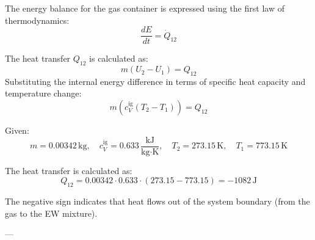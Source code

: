 The energy balance for the gas container is expressed using the first law of thermodynamics:  
\[
\frac{dE}{dt} = \dot{Q}_{12}
\]  

The heat transfer \( Q_{12} \) is calculated as:  
\[
m (U_2 - U_1) = Q_{12}
\]  
Substituting the internal energy difference in terms of specific heat capacity and temperature change:  
\[
m \left( c_V^{\text{ig}} (T_2 - T_1) \right) = Q_{12}
\]  

Given:  
\[
m = 0.00342 \, \text{kg}, \quad c_V^{\text{ig}} = 0.633 \, \frac{\text{kJ}}{\text{kg·K}}, \quad T_2 = 273.15 \, \text{K}, \quad T_1 = 773.15 \, \text{K}
\]  

The heat transfer is calculated as:  
\[
Q_{12} = 0.00342 \cdot 0.633 \cdot (273.15 - 773.15) = -1082 \, \text{J}
\]  

The negative sign indicates that heat flows out of the system boundary (from the gas to the EW mixture).  

---
